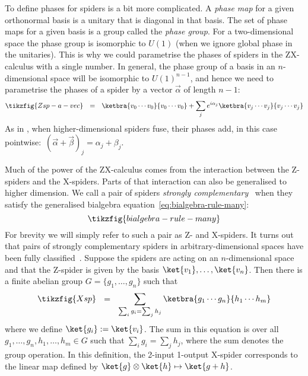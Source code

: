 \documentclass[a4paper,onecolumn,superscriptaddress,11pt,%
				unpublished,%
				allowfontchageintitle,%
				]{quantumarticle}
\begin{document}
To define phases for spiders is a bit more complicated. A \emph{phase map} for a given orthonormal basis is a unitary that is diagonal in that basis. The set of phase maps for a given basis is a group called the \emph{phase group}.
For a two-dimensional space the phase group is isomorphic to $U(1)$ (when we ignore global phase in the unitaries). This is why we could parametrise the phases of spiders in the ZX-calculus with a single number.
In general, the phase group of a basis in an $n$-dimensional space will be isomorphic to $U(1)^{n-1}$, and hence we need to parametrise the phases of a spider by a vector $\vec \alpha$ of length $n-1$:
\begin{equation}\label{eq:Zsp-ndim}
	\tikzfig{Zsp-a-vec} \ \ = \ \ \ketbra{v_0\cdots v_0}{v_0 \cdots v_0} + \sum_j e^{i\alpha_j}\ketbra{v_j\cdots v_j}{v_j\cdots v_j}
\end{equation}
As in \SpiderRule, when higher-dimensional spiders fuse, their phases add, in this case pointwise:~$(\vec \alpha + \vec \beta)_j = \alpha_j + \beta_j$.

Much of the power of the ZX-calculus comes from the interaction between the Z-spiders and the X-spiders. Parts of that interaction can also be generalised to higher dimension.
We call a pair of spiders \emph{strongly complementary}~\cite{coecke2012strong} when they satisfy the generalised bialgebra equation~\eqref{eq:bialgebra-rule-many}:
\begin{equation}
	\tikzfig{bialgebra-rule-many}
\end{equation}
For brevity we will simply refer to such a pair as Z- and X-spiders.
It turns out that pairs of strongly complementary spiders in arbitrary-dimensional spaces have been fully classified~\cite{coecke2012strong}. 
Suppose the spiders are acting on an $n$-dimensional space and that the Z-spider is given by the basis $\ket{v_1},\ldots,\ket{v_n}$. Then there is a finite abelian group $G=\{g_1,\ldots,g_n\}$ such that
\begin{equation}\label{eq:strongcomp-spider}
	\tikzfig{Xsp} \ \ = \ \ \sum_{\sum_i g_i = \sum_j h_j} \ketbra{g_1\cdots g_n}{h_1\cdots h_m}
\end{equation}
where we define $\ket{g_i} := \ket{v_i}$. The sum in this equation is over all $g_1,\ldots, g_n,h_1,\ldots, h_m \in G$ such that $\sum_i g_i = \sum_j h_j$, where the sum denotes the group operation. In this definition, the 2-input 1-output X-spider corresponds to the linear map defined by $\ket{g}\otimes \ket{h} \mapsto \ket{g+h}$.
\end{document}

